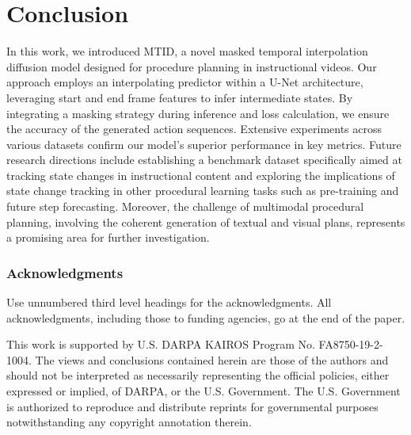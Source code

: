 \section{Conclusion}
In this work, we introduced MTID, a novel masked temporal interpolation diffusion model designed for procedure planning in instructional videos. Our approach employs an interpolating predictor within a U-Net architecture, leveraging start and end frame features to infer intermediate states. By integrating a masking strategy during inference and loss calculation, we ensure the accuracy of the generated action sequences. Extensive experiments across various datasets confirm our model's superior performance in key metrics. Future research directions include establishing a benchmark dataset specifically aimed at tracking state changes in instructional content and exploring the implications of state change tracking in other procedural learning tasks such as pre-training and future step forecasting. Moreover, the challenge of multimodal procedural planning, involving the coherent generation of textual and visual plans, represents a promising area for further investigation.

\subsubsection*{Acknowledgments}
Use unnumbered third level headings for the acknowledgments. All
acknowledgments, including those to funding agencies, go at the end of the paper.

This work is supported by U.S. DARPA KAIROS Program No. FA8750-19-2-1004. The views and conclusions contained herein are those of the authors and should not be interpreted as necessarily representing the official policies, either expressed or implied, of DARPA, or the U.S. Government. The U.S. Government is authorized to reproduce and distribute reprints for governmental purposes notwithstanding any copyright annotation therein.

